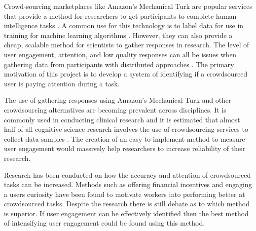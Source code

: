 \documentclass{article}
\begin{document}
Crowd-sourcing marketplaces like Amazon’s Mechanical Turk are popular services that provide a method for researchers to get participants to complete human intelligence tasks \cite{paolacci2010running}. 
A common use for this technology is to label data for use in training for machine learning algorithms \cite{chang2017revolt}.
However, they can also provide a cheap, scalable method for scientists to gather responses in research.
The level of user engagement, attention, and low quality responses can all be issues when gathering data from participants with distributed approaches \cite{ipeirotis2010quality}.
The primary motivation of this project is to develop a system of identifying if a crowdsourced user is paying attention during a task.

The use of gathering responses using Amazon's Mechanical Turk and other crowdsourcing alternatives are becoming prevalent across disciplines.
It is commonly used in conducting clinical research \cite{chandler2016conducting} and it is estimated that almost half of all cognitive science research involves the use of crowdsourcing services to collect data samples \cite{stewart2017crowdsourcing}.
The creation of an easy to implement method to measure user engagement would massively help researchers to increase reliability of their research.

Research has been conducted on how the accuracy and attention of crowdsourced tasks can be increased.
Methods such as offering financial incentives \cite{ho2015incentivizing} and engaging a users curiosity \cite{law2016curiosity} have been found to motivate workers into performing better at crowdsourced tasks.
Despite the research there is still debate as to which method is superior.
If user engagement can be effectively identified then the best method of intensifying user engagement could be found using this method.


\end{document}
